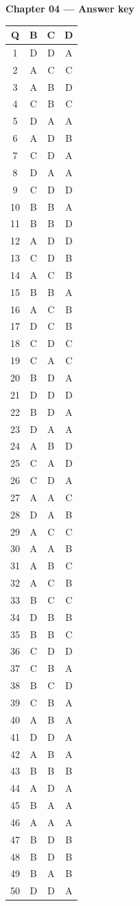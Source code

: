 \documentclass[11pt]{article}
\begin{document}
\begin{center}{\Large\bfseries Chapter 04 --- Answer key}\end{center}
\vspace{6pt}
\begin{center}
\begin{longtable}{c|ccc}
\textbf{Q} & \textbf{B} & \textbf{C} & \textbf{D}\\\hline\endhead
1 & D & D & A \\
2 & A & C & C \\
3 & A & B & D \\
4 & C & B & C \\
5 & D & A & A \\
6 & A & D & B \\
7 & C & D & A \\
8 & D & A & A \\
9 & C & D & D \\
10 & B & B & A \\
11 & B & B & D \\
12 & A & D & D \\
13 & C & D & B \\
14 & A & C & B \\
15 & B & B & A \\
16 & A & C & B \\
17 & D & C & B \\
18 & C & D & C \\
19 & C & A & C \\
20 & B & D & A \\
21 & D & D & D \\
22 & B & D & A \\
23 & D & A & A \\
24 & A & B & D \\
25 & C & A & D \\
26 & C & D & A \\
27 & A & A & C \\
28 & D & A & B \\
29 & A & C & C \\
30 & A & A & B \\
31 & A & B & C \\
32 & A & C & B \\
33 & B & C & C \\
34 & D & B & B \\
35 & B & B & C \\
36 & C & D & D \\
37 & C & B & A \\
38 & B & C & D \\
39 & C & B & A \\
40 & A & B & A \\
41 & D & D & A \\
42 & A & B & A \\
43 & B & B & B \\
44 & A & D & A \\
45 & B & A & A \\
46 & A & A & A \\
47 & B & D & B \\
48 & B & D & B \\
49 & B & A & B \\
50 & D & D & A \\
\end{longtable}\end{center}
\end{document}
